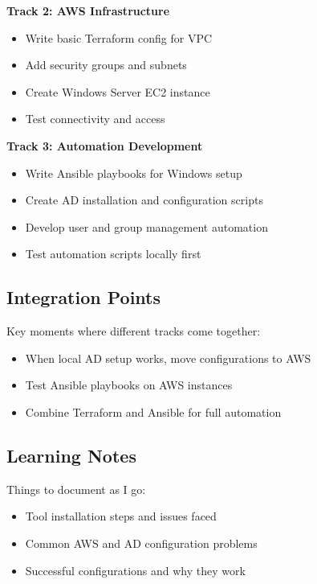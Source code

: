 \documentclass[11pt,a4paper]{article}
\begin{document}
\textbf{Track 2: AWS Infrastructure
}
\begin{itemize}
    \item Write basic Terraform config for VPC
    \item Add security groups and subnets
    \item Create Windows Server EC2 instance
    \item Test connectivity and access
\end{itemize}

\textbf{Track 3: Automation Development}
\begin{itemize}
    \item Write Ansible playbooks for Windows setup
    \item Create AD installation and configuration scripts
    \item Develop user and group management automation
    \item Test automation scripts locally first
\end{itemize}

\subsection{Integration Points}
Key moments where different tracks come together:

\begin{itemize}
    \item When local AD setup works, move configurations to AWS
    \item Test Ansible playbooks on AWS instances
    \item Combine Terraform and Ansible for full automation
\end{itemize}

\subsection{Learning Notes}
Things to document as I go:

\begin{itemize}
    \item Tool installation steps and issues faced
    \item Common AWS and AD configuration problems
    \item Successful configurations and why they work
\end{itemize}
\end{document}
